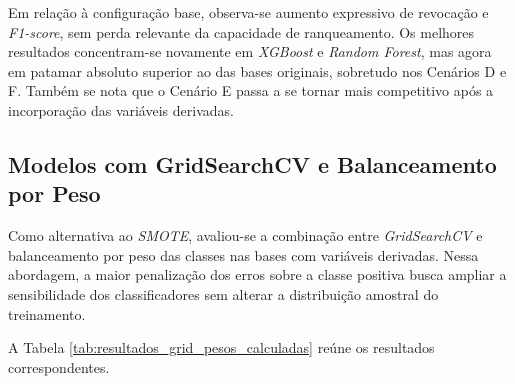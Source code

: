 Em relação à configuração base, observa-se aumento expressivo de revocação e \textit{F1-score}, sem perda relevante da capacidade de ranqueamento. Os melhores resultados concentram-se novamente em \textit{XGBoost} e \textit{Random Forest}, mas agora em patamar absoluto superior ao das bases originais, sobretudo nos Cenários D e F. Também se nota que o Cenário E passa a se tornar mais competitivo após a incorporação das variáveis derivadas.

\subsection{Modelos com GridSearchCV e Balanceamento por Peso}

Como alternativa ao \textit{SMOTE}, avaliou-se a combinação entre \textit{GridSearchCV} e balanceamento por peso das classes nas bases com variáveis derivadas. Nessa abordagem, a maior penalização dos erros sobre a classe positiva busca ampliar a sensibilidade dos classificadores sem alterar a distribuição amostral do treinamento.

A Tabela \ref{tab:resultados_grid_pesos_calculadas} reúne os resultados correspondentes.

\begingroup
\footnotesize
\setlength{\tabcolsep}{4pt}


